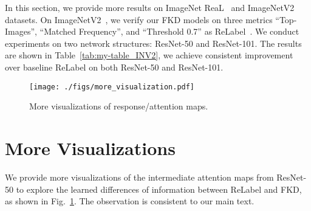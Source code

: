 \documentclass[10pt,twocolumn,letterpaper]{article}
\begin{document}
In this section, we provide more results on  ImageNet ReaL~\cite{beyer2020we} and ImageNetV2~\cite{recht2019imagenet} datasets. On ImageNetV2~\cite{recht2019imagenet}, we verify our FKD models on three metrics ``Top-Images'', ``Matched Frequency'', and ``Threshold
0.7'' as ReLabel~\cite{yun2021re}. We conduct experiments on two network structures: ResNet-50 and ResNet-101. The results are shown in Table~\ref{tab:my-table_INV2}, we achieve consistent improvement over baseline ReLabel on both ResNet-50 and ResNet-101.

\begin{table}[h]
\centering
\caption{Results of FKD on ImageNet ReaL~\cite{beyer2020we} and ImageNetV2~\cite{recht2019imagenet} with ResNet-\{50, 101\}.  indicates that the results are tested using their provided pre-trained model.}
\label{tab:my-table_INV2}
\vspace{-0.1in}
{\renewcommand{\arraystretch}{0.9}
}
\end{table}


\begin{figure}[h]
  \centering
  \texttt{[image: ./figs/more\_visualization.pdf]}
  \vspace{-0.15in}
  \caption{More visualizations of response/attention maps.} 
  \label{fig:more_att_visualization}
  \vspace{-0.1in}
\end{figure}

\section{More Visualizations}
We provide more visualizations of the intermediate attention maps from ResNet-50 to explore the learned differences of information between ReLabel and FKD, as shown in Fig.~\ref{fig:more_att_visualization}. The observation is consistent to our main text.
\end{document}

